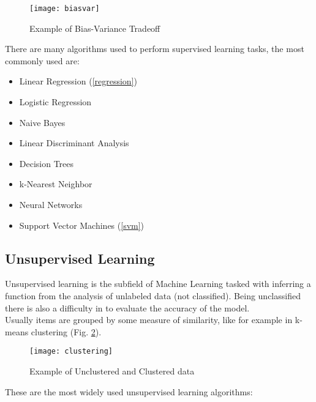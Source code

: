\begin{itemize}
	\begin{figure}[H]
		\centering
		\texttt{[image: biasvar]}
		\caption{Example of Bias-Variance Tradeoff \cite{biasvarTradeoff}}
		\label{fig:biasvar}
	\end{figure}	
\end{itemize}

There are many algorithms used to perform supervised learning tasks, the most commonly used are:

\begin{itemize}[noitemsep, topsep = -5pt]
	\item Linear Regression (\ref{regression})
	\item Logistic Regression
	\item Naive Bayes
	\item Linear Discriminant Analysis
	\item Decision Trees
	\item k-Nearest Neighbor
	\item Neural Networks
	\item Support Vector Machines (\ref{svm})
\end{itemize}


\subsection{Unsupervised Learning} \label{unsupervised}
Unsupervised learning is the subfield of Machine Learning tasked with inferring a function from the analysis of unlabeled data (not classified). Being unclassified there is also a difficulty in to evaluate the accuracy of the model.\\
Usually items are grouped by some measure of similarity, like for example in k-means clustering (Fig. \ref{fig:clustering}).

\begin{figure}[H]
	\centering
	\texttt{[image: clustering]}
	\caption{Example of Unclustered and Clustered data \cite{kmeans}}
	\label{fig:clustering}
\end{figure}	

These are the most widely used unsupervised learning algorithms:

